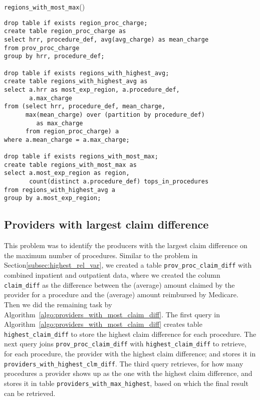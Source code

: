 \begin{algorithm}
\vspace{-2pt}
\caption{{\sf \texttt{regions\_with\_most\_max}}()}
\label{algo:regions_with_most_max}
\begin{verbatim}
drop table if exists region_proc_charge;
create table region_proc_charge as
select hrr, procedure_def, avg(avg_charge) as mean_charge
from prov_proc_charge
group by hrr, procedure_def;

drop table if exists regions_with_highest_avg;
create table regions_with_highest_avg as
select a.hrr as most_exp_region, a.procedure_def, 
       a.max_charge
from (select hrr, procedure_def, mean_charge, 
      max(mean_charge) over (partition by procedure_def) 
         as max_charge
      from region_proc_charge) a
where a.mean_charge = a.max_charge;

drop table if exists regions_with_most_max;
create table regions_with_most_max as
select a.most_exp_region as region, 
       count(distinct a.procedure_def) tops_in_procedures
from regions_with_highest_avg a
group by a.most_exp_region;
\end{verbatim}
\end{algorithm}


\subsection{Providers with largest claim difference}
\label{subsec:providers_with_most_claim_diff}
This problem was to identify the producers with the largest claim difference on the maximum number of procedures. Similar to the problem in Section\ref{subsec:highest_rel_var}, we created a table \texttt{prov\_proc\_claim\_diff} with combined inpatient and outpatient data, where we created the column \texttt{claim\_diff} as the difference between the (average) amount claimed by the provider for a procedure and the (average) amount reimbursed by Medicare. Then we did the remaining task by Algorithm~\ref{algo:providers_with_most_claim_diff}. The first query in Algorithm~\ref{algo:providers_with_most_claim_diff} creates table \texttt{highest\_claim\_diff} to store the highest claim difference for each procedure. The next query joins \texttt{prov\_proc\_claim\_diff} with \texttt{highest\_claim\_diff} to retrieve, for each procedure, the provider with the highest claim difference; and stores it in  \texttt{providers\_with\_highest\_clm\_diff}. The third query retrieves, for how many procedures a provider shows up as the one with the highest claim difference, and stores it in table \texttt{providers\_with\_max\_highest}, based on which the final result can be retrieved.\\


